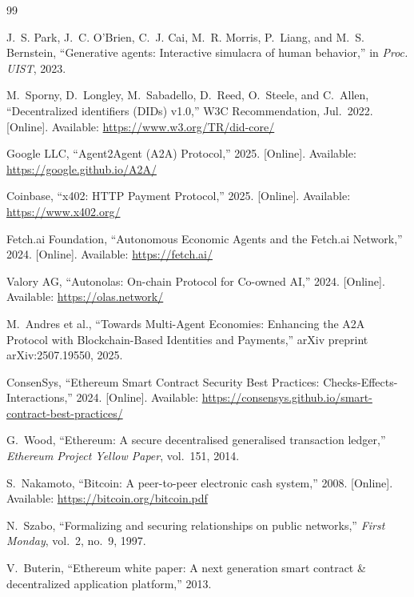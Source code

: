 \documentclass[conference]{IEEEtran}
\begin{document}
\begin{thebibliography}{99}

J.~S. Park, J.~C. O'Brien, C.~J. Cai, M.~R. Morris, P.~Liang, and
M.~S. Bernstein,
``Generative agents: Interactive simulacra of human behavior,''
in \textit{Proc. UIST}, 2023.

M.~Sporny, D.~Longley, M.~Sabadello, D.~Reed, O.~Steele, and
C.~Allen,
``Decentralized identifiers (DIDs) v1.0,'' W3C Recommendation,
Jul.\ 2022. [Online]. Available: \url{https://www.w3.org/TR/did-core/}

Google LLC,
``Agent2Agent (A2A) Protocol,'' 2025.
[Online]. Available: \url{https://google.github.io/A2A/}

Coinbase,
``x402: HTTP Payment Protocol,'' 2025.
[Online]. Available: \url{https://www.x402.org/}

Fetch.ai Foundation,
``Autonomous Economic Agents and the Fetch.ai Network,'' 2024.
[Online]. Available: \url{https://fetch.ai/}

Valory AG,
``Autonolas: On-chain Protocol for Co-owned AI,'' 2024.
[Online]. Available: \url{https://olas.network/}

M.~Andres et al.,
``Towards Multi-Agent Economies: Enhancing the A2A Protocol with
Blockchain-Based Identities and Payments,''
arXiv preprint arXiv:2507.19550, 2025.

ConsenSys,
``Ethereum Smart Contract Security Best Practices: Checks-Effects-Interactions,''
2024. [Online]. Available:
\url{https://consensys.github.io/smart-contract-best-practices/}

G.~Wood,
``Ethereum: A secure decentralised generalised transaction ledger,''
\textit{Ethereum Project Yellow Paper}, vol.~151, 2014.

S.~Nakamoto,
``Bitcoin: A peer-to-peer electronic cash system,'' 2008.
[Online]. Available: \url{https://bitcoin.org/bitcoin.pdf}

N.~Szabo,
``Formalizing and securing relationships on public networks,''
\textit{First Monday}, vol.~2, no.~9, 1997.

V.~Buterin,
``Ethereum white paper: A next generation smart contract \& decentralized
application platform,'' 2013.

\end{thebibliography}
\end{document}
